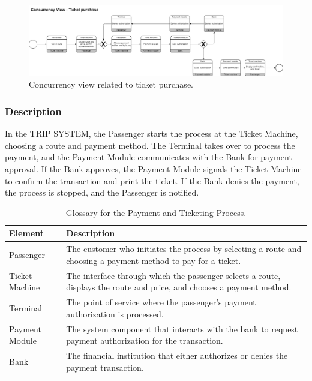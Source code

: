 \begin{figure}[H]
    \centering
    \includegraphics[width=\textwidth]{drawings/views_final_version/concurrency_view_1.png}
    \caption{Concurrency view related to ticket purchase.}
    \label{fig:concurrency_view_1}
\end{figure}

\subsubsection{Description}
In the TRIP SYSTEM, the Passenger starts the process at the Ticket Machine, choosing a route and payment method. The Terminal takes over to process the payment, and the Payment Module communicates with the Bank for payment approval. If the Bank approves, the Payment Module signals the Ticket Machine to confirm the transaction and print the ticket. If the Bank denies the payment, the process is stopped, and the Passenger is notified.

\begin{table}[H]
    \centering
    \caption{Glossary for the Payment and Ticketing Process.}
    \label{tab:payment_ticketing_glossary}
    \begin{tabularx}{\textwidth}{@{}lX@{}} %
    \toprule
    \textbf{Element} & \textbf{Description} \\
    \midrule
    Passenger & The customer who initiates the process by selecting a route and choosing a payment method to pay for a ticket. \\
    Ticket Machine & The interface through which the passenger selects a route, displays the route and price, and chooses a payment method. \\
    Terminal & The point of service where the passenger's payment authorization is processed. \\
    Payment Module & The system component that interacts with the bank to request payment authorization for the transaction. \\
    Bank & The financial institution that either authorizes or denies the payment transaction. \\
    \bottomrule
    \end{tabularx}
\end{table}


